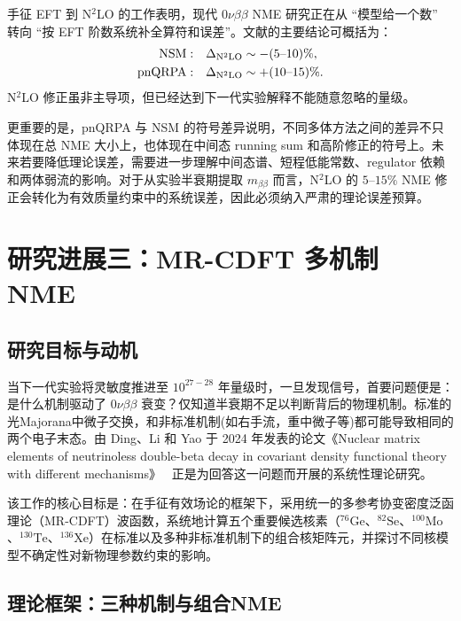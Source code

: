 \documentclass[12pt,a4paper]{ctexart}
\begin{document}
手征 EFT 到 N$^2$LO 的工作表明，现代 $0\nu\beta\beta$ NME 研究正在从 ``模型给一个数'' 转向 ``按 EFT 阶数系统补全算符和误差''。文献\cite{Castillo2025}的主要结论可概括为：
\begin{align}
	{\rm NSM:}\quad &\Delta_{\rm N^2LO}\sim -(5\text{--}10)\%,\\
	{\rm pnQRPA:}\quad &\Delta_{\rm N^2LO}\sim +(10\text{--}15)\%.
\end{align}
N$^2$LO 修正虽非主导项，但已经达到下一代实验解释不能随意忽略的量级。

更重要的是，pnQRPA 与 NSM 的符号差异说明，不同多体方法之间的差异不只体现在总 NME 大小上，也体现在中间态 running sum 和高阶修正的符号上。未来若要降低理论误差，需要进一步理解中间态谱、短程低能常数、regulator 依赖和两体弱流的影响。对于从实验半衰期提取 $m_{\beta\beta}$ 而言，N$^2$LO 的 $5$--$15\%$ NME 修正会转化为有效质量约束中的系统误差，因此必须纳入严肃的理论误差预算。

\section{研究进展三：MR-CDFT 多机制 NME}

\subsection{研究目标与动机}

当下一代实验将灵敏度推进至 $10^{27-28}$ 年量级时，一旦发现信号，首要问题便是：是什么机制驱动了 $0\nu\beta\beta$ 衰变？仅知道半衰期不足以判断背后的物理机制。标准的光Majorana中微子交换，和非标准机制(如右手流，重中微子等)都可能导致相同的两个电子末态。由 Ding、Li 和 Yao 于 2024 年发表的论文《Nuclear matrix elements of neutrinoless double-beta decay in covariant density functional theory with different mechanisms》~\cite{Ding2024} 正是为回答这一问题而开展的系统性理论研究。

该工作的核心目标是：在手征有效场论的框架下，采用统一的多参考协变密度泛函理论（MR-CDFT）波函数，系统地计算五个重要候选核素（$^{76}\mathrm{Ge}$、$^{82}\mathrm{Se}$、$^{100}\mathrm{Mo}$、$^{130}\mathrm{Te}$、$^{136}\mathrm{Xe}$）在标准以及多种非标准机制下的组合核矩阵元，并探讨不同核模型不确定性对新物理参数约束的影响。

\subsection{理论框架：三种机制与组合NME}
\end{document}
